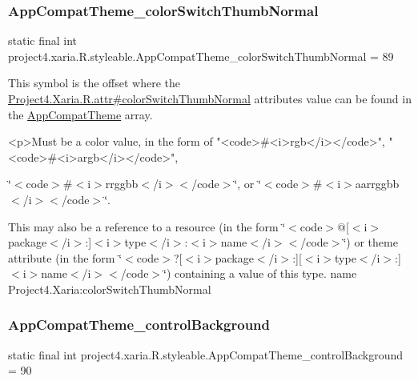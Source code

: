 \subsubsection{\texorpdfstring{App\+Compat\+Theme\+\_\+color\+Switch\+Thumb\+Normal}{AppCompatTheme\_colorSwitchThumbNormal}}
{\footnotesize\ttfamily static final int project4.\+xaria.\+R.\+styleable.\+App\+Compat\+Theme\+\_\+color\+Switch\+Thumb\+Normal = 89\hspace{0.3cm}{\ttfamily [static]}}

This symbol is the offset where the \hyperlink{}{Project4.\+Xaria.\+R.\+attr\#color\+Switch\+Thumb\+Normal} attribute\textquotesingle{}s value can be found in the \hyperlink{classproject4_1_1xaria_1_1R_1_1styleable_aad8bec413e2350f9404e6ff0e831a85d}{App\+Compat\+Theme} array.

\begin{DoxyVerb}      <p>Must be a color value, in the form of "<code>#<i>rgb</i></code>", "<code>#<i>argb</i></code>",
\end{DoxyVerb}
 \char`\"{}$<$code$>$\#$<$i$>$rrggbb$<$/i$>$$<$/code$>$\char`\"{}, or \char`\"{}$<$code$>$\#$<$i$>$aarrggbb$<$/i$>$$<$/code$>$\char`\"{}. 

This may also be a reference to a resource (in the form \char`\"{}$<$code$>$@\mbox{[}$<$i$>$package$<$/i$>$\+:\mbox{]}$<$i$>$type$<$/i$>$\+:$<$i$>$name$<$/i$>$$<$/code$>$\char`\"{}) or theme attribute (in the form \char`\"{}$<$code$>$?\mbox{[}$<$i$>$package$<$/i$>$\+:\mbox{]}\mbox{[}$<$i$>$type$<$/i$>$\+:\mbox{]}$<$i$>$name$<$/i$>$$<$/code$>$\char`\"{}) containing a value of this type.  name Project4.\+Xaria\+:color\+Switch\+Thumb\+Normal \mbox{\label{classproject4_1_1xaria_1_1R_1_1styleable_a476553481ffe8e73dfc05dfcd351d945}} 
\subsubsection{\texorpdfstring{App\+Compat\+Theme\+\_\+control\+Background}{AppCompatTheme\_controlBackground}}
{\footnotesize\ttfamily static final int project4.\+xaria.\+R.\+styleable.\+App\+Compat\+Theme\+\_\+control\+Background = 90\hspace{0.3cm}{\ttfamily [static]}}

